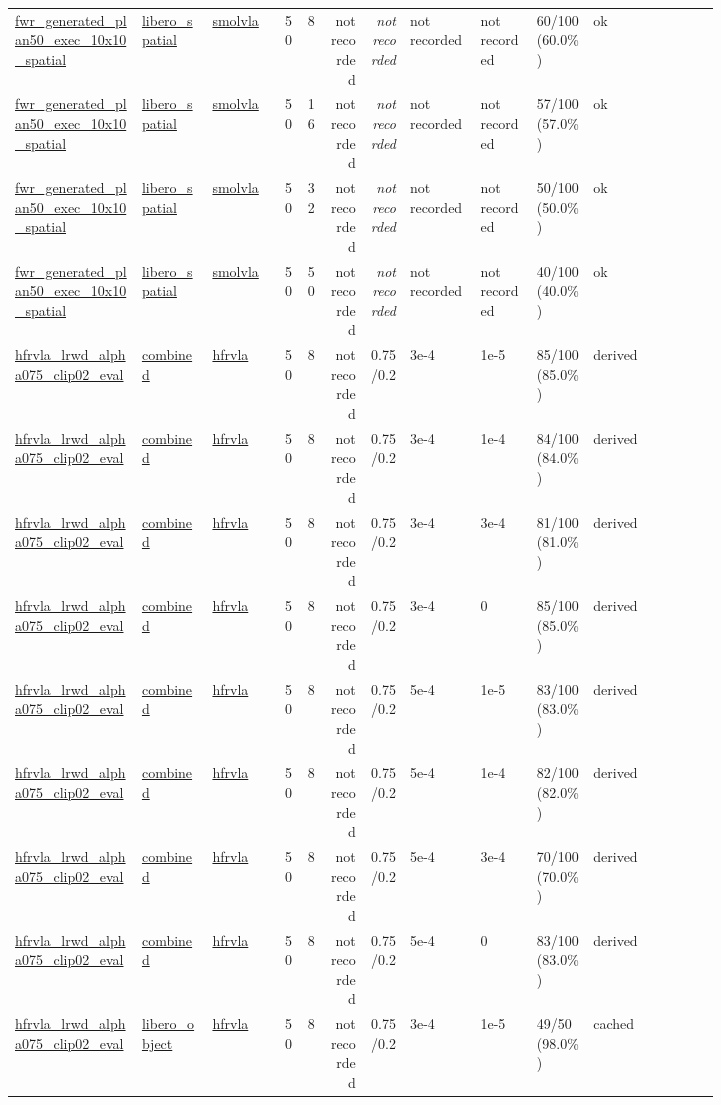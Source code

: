 \begin{tiny}
\begin{longtable}{@{}p{0.18\linewidth}p{0.10\linewidth}p{0.10\linewidth}rrrrp{0.10\linewidth}p{0.08\linewidth}p{0.08\linewidth}p{0.11\linewidth}p{0.07\linewidth}@{}}
\url{fwr_generated_plan50_exec_10x10_spatial} & \url{libero_spatial} & \url{smolvla} & 50 & 8 & not recorded & \emph{not recorded} & not recorded & not recorded & 60/100 (60.0\%) & ok \\
\url{fwr_generated_plan50_exec_10x10_spatial} & \url{libero_spatial} & \url{smolvla} & 50 & 16 & not recorded & \emph{not recorded} & not recorded & not recorded & 57/100 (57.0\%) & ok \\
\url{fwr_generated_plan50_exec_10x10_spatial} & \url{libero_spatial} & \url{smolvla} & 50 & 32 & not recorded & \emph{not recorded} & not recorded & not recorded & 50/100 (50.0\%) & ok \\
\url{fwr_generated_plan50_exec_10x10_spatial} & \url{libero_spatial} & \url{smolvla} & 50 & 50 & not recorded & \emph{not recorded} & not recorded & not recorded & 40/100 (40.0\%) & ok \\
\url{hfrvla_lrwd_alpha075_clip02_eval} & \url{combined} & \url{hfrvla} & 50 & 8 & not recorded & 0.75/0.2 & 3e-4 & 1e-5 & 85/100 (85.0\%) & derived \\
\url{hfrvla_lrwd_alpha075_clip02_eval} & \url{combined} & \url{hfrvla} & 50 & 8 & not recorded & 0.75/0.2 & 3e-4 & 1e-4 & 84/100 (84.0\%) & derived \\
\url{hfrvla_lrwd_alpha075_clip02_eval} & \url{combined} & \url{hfrvla} & 50 & 8 & not recorded & 0.75/0.2 & 3e-4 & 3e-4 & 81/100 (81.0\%) & derived \\
\url{hfrvla_lrwd_alpha075_clip02_eval} & \url{combined} & \url{hfrvla} & 50 & 8 & not recorded & 0.75/0.2 & 3e-4 & 0 & 85/100 (85.0\%) & derived \\
\url{hfrvla_lrwd_alpha075_clip02_eval} & \url{combined} & \url{hfrvla} & 50 & 8 & not recorded & 0.75/0.2 & 5e-4 & 1e-5 & 83/100 (83.0\%) & derived \\
\url{hfrvla_lrwd_alpha075_clip02_eval} & \url{combined} & \url{hfrvla} & 50 & 8 & not recorded & 0.75/0.2 & 5e-4 & 1e-4 & 82/100 (82.0\%) & derived \\
\url{hfrvla_lrwd_alpha075_clip02_eval} & \url{combined} & \url{hfrvla} & 50 & 8 & not recorded & 0.75/0.2 & 5e-4 & 3e-4 & 70/100 (70.0\%) & derived \\
\url{hfrvla_lrwd_alpha075_clip02_eval} & \url{combined} & \url{hfrvla} & 50 & 8 & not recorded & 0.75/0.2 & 5e-4 & 0 & 83/100 (83.0\%) & derived \\
\url{hfrvla_lrwd_alpha075_clip02_eval} & \url{libero_object} & \url{hfrvla} & 50 & 8 & not recorded & 0.75/0.2 & 3e-4 & 1e-5 & 49/50 (98.0\%) & cached \\

\end{longtable}
\end{tiny}
